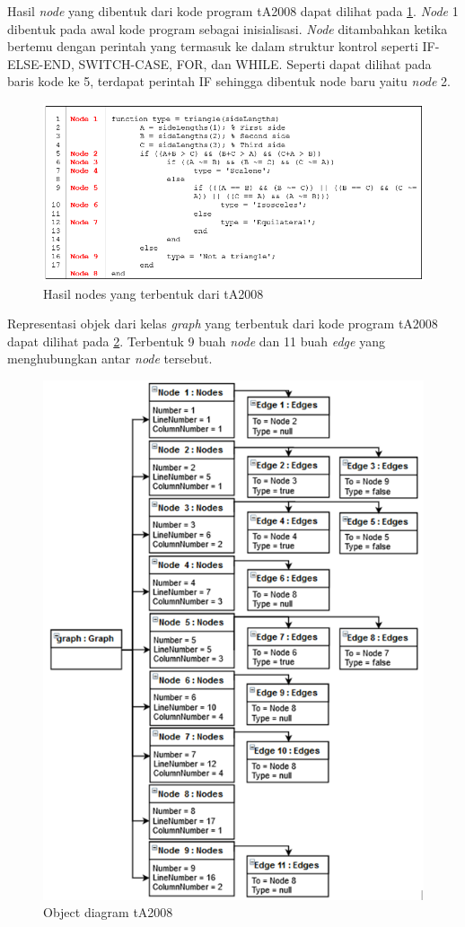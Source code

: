 Hasil \textit{node} yang dibentuk dari kode program tA2008 dapat dilihat pada \ref{fig:hasil-node}. \textit{Node} 1 dibentuk pada awal kode program sebagai inisialisasi. \textit{Node} ditambahkan ketika bertemu dengan perintah yang termasuk ke dalam struktur kontrol seperti IF-ELSE-END, SWITCH-CASE, FOR, dan WHILE. Seperti dapat dilihat pada baris kode ke 5, terdapat perintah IF sehingga dibentuk node baru yaitu \textit{node} 2. 
\begin{figure}
	\centering
	\includegraphics[width=0.9\linewidth]{"gambar/hasil node"}
	\caption{Hasil nodes yang terbentuk dari tA2008}
	\label{fig:hasil-node}
\end{figure}
Representasi objek dari kelas \textit{graph} yang terbentuk dari kode program tA2008 dapat dilihat pada \ref{fig:objectdiagram}. Terbentuk 9 buah \textit{node} dan 11 buah \textit{edge} yang menghubungkan antar \textit{node} tersebut.
\begin{figure}
	\centering
	\includegraphics[width=0.9\linewidth]{gambar/ObjectDiagram}
	\caption{Object diagram tA2008}
	\label{fig:objectdiagram}
\end{figure}

